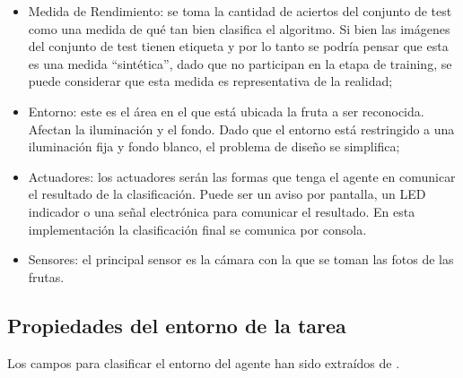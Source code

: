 \documentclass[10pt, a4paper]{article}
\begin{document}
\begin{itemize}
    \item Medida de Rendimiento: se toma la cantidad de aciertos del conjunto de test como una medida de qué tan bien clasifica el algoritmo. Si bien las imágenes del conjunto de test tienen etiqueta y por lo tanto se podría pensar que esta es una medida ``sintética'', dado que no participan en la etapa de training, se puede considerar que esta medida es representativa de la realidad;
    
    \item Entorno: este es el área en el que está ubicada la fruta a ser reconocida. Afectan la iluminación y el fondo. Dado que el entorno está restringido a una iluminación fija y fondo blanco, el problema de diseño se simplifica;
    
    \item Actuadores: los actuadores serán las formas que tenga el agente en comunicar el resultado de la clasificación. Puede ser un aviso por pantalla, un LED indicador o una señal electrónica para comunicar el resultado. En esta implementación la clasificación final se comunica por consola.
    
    \item Sensores: el principal sensor es la cámara con la que se toman las fotos de las frutas.
\end{itemize}


\subsection{Propiedades del entorno de la tarea}

Los campos para clasificar el entorno del agente han sido extraídos de \textcite{russell-norvig}.
\end{document}
